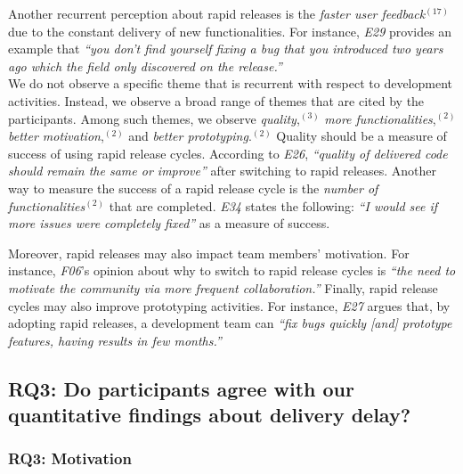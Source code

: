 Another recurrent perception about rapid releases is the {\em faster user
feedback}$^{(17)}$ due to the constant delivery of new functionalities. For
instance, {\em E29} provides an example that {\em ``you don't find yourself
fixing a bug that you introduced two years ago which the field only discovered on the
release.''}\\

\noindent{}
We do not observe a specific theme that is recurrent with respect
to development activities. Instead, we observe a broad range of themes that are
cited by the participants. Among such themes, we observe {\em quality},$^{(3)}$
{\em more functionalities},$^{(2)}$ {\em better motivation},$^{(2)}$ and {\em
better prototyping}.$^{(2)}$ Quality should be a measure of success of using
rapid release cycles. According to {\em E26}, {\em ``quality of delivered code
should remain the same or improve''} after switching to rapid releases. Another
way to measure the success of a rapid release cycle is the {\em number of
functionalities}$^{(2)}$ that are completed. {\em E34} states the following: {\em
``I would see if more issues were completely fixed''} as a measure of success. 

Moreover, rapid releases may also impact team members' motivation. For instance,
{\em F06}'s opinion about why to switch to rapid release cycles is {\em ``the
need to motivate the community via more frequent collaboration.''} Finally,
rapid release cycles may also improve prototyping activities. For instance, {\em
E27} argues that, by adopting rapid releases, a development team can {\em ``fix
bugs quickly [and] prototype features, having results in few months.''}


\subsection{RQ3: Do participants agree with our quantitative
findings about delivery delay?}\label{ch5:rq3}

\subsubsection*{RQ3: Motivation}

